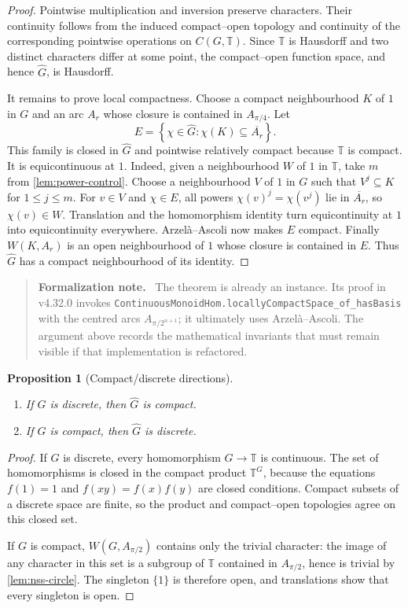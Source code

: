 \documentclass[11pt]{article}
\newtheorem{proposition}[theorem]{Proposition}
\theoremstyle{definition}
\theoremstyle{remark}
\newcommand{\T}{\mathbb T}
\newcommand{\dual}[1]{\widehat{#1}}
\newcommand{\set}[1]{\left\{#1\right\}}
\newenvironment{formalization}
  {\begin{quote}\small\noindent\textbf{Formalization note.}\ }
  {\end{quote}}
\begin{document}
\begin{proof}
Pointwise multiplication and inversion preserve characters.  Their continuity follows
from the induced compact--open topology and continuity of the corresponding pointwise
operations on $C(G,\T)$.  Since $\T$ is Hausdorff and two distinct characters differ at
some point, the compact--open function space, and hence $\dual G$, is Hausdorff.

It remains to prove local compactness.  Choose a compact neighbourhood $K$ of $1$ in
$G$ and an arc $A_r$ whose closure is contained in $A_{\pi/4}$.  Let
\[
  E=\set{\chi\in\dual G:\chi(K)\subseteq\overline{A_r}}.
\]
This family is closed in $\dual G$ and pointwise relatively compact because $\T$ is
compact.  It is equicontinuous at $1$.  Indeed, given a neighbourhood $W$ of $1$ in
$\T$, take $m$ from \cref{lem:power-control}.  Choose a neighbourhood $V$ of $1$ in
$G$ such that $V^j\subseteq K$ for $1\leq j\leq m$.  For $v\in V$ and $\chi\in E$,
all powers $\chi(v)^j=\chi(v^j)$ lie in $\overline{A_r}$, so $\chi(v)\in W$.
Translation and the homomorphism identity turn equicontinuity at $1$ into
equicontinuity everywhere.  Arzel\`a--Ascoli now makes $E$ compact.  Finally
$W(K,A_r)$ is an open neighbourhood of $1$ whose closure is contained in $E$.
Thus $\dual G$ has a compact neighbourhood of its identity.
\end{proof}

\begin{formalization}
The theorem is already an instance.  Its proof in v4.32.0 invokes
\texttt{ContinuousMonoidHom.locallyCompactSpace\_of\_hasBasis} with the centred arcs
$A_{\pi/2^{n+1}}$; it ultimately uses Arzel\`a--Ascoli.  The argument above records the
mathematical invariants that must remain visible if that implementation is refactored.
\end{formalization}

\begin{proposition}[Compact/discrete directions]
\label{prop:compact-discrete-basic}
\begin{enumerate}[label=(\alph*)]
\item If $G$ is discrete, then $\dual G$ is compact.
\item If $G$ is compact, then $\dual G$ is discrete.
\end{enumerate}
\end{proposition}

\begin{proof}
If $G$ is discrete, every homomorphism $G\to\T$ is continuous.  The set of
homomorphisms is closed in the compact product $\T^G$, because the equations
$f(1)=1$ and $f(xy)=f(x)f(y)$ are closed conditions.  Compact subsets of a discrete
space are finite, so the product and compact--open topologies agree on this closed set.

If $G$ is compact, $W(G,A_{\pi/2})$ contains only the trivial character: the image of
any character in this set is a subgroup of $\T$ contained in $A_{\pi/2}$, hence is
trivial by \cref{lem:nss-circle}.  The singleton $\{1\}$ is therefore open, and
translations show that every singleton is open.
\end{proof}
\end{document}
